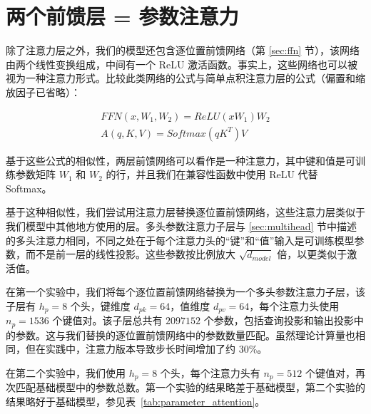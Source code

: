 \pagebreak
\section*{两个前馈层 = 参数注意力}\label{sec:parameter_attention}

除了注意力层之外，我们的模型还包含逐位置前馈网络（第 \ref{sec:ffn} 节），该网络由两个线性变换组成，中间有一个 ReLU 激活函数。事实上，这些网络也可以被视为一种注意力形式。比较此类网络的公式与简单点积注意力层的公式（偏置和缩放因子已省略）：

\begin{align*}
    FFN(x, W_1, W_2) = ReLU(xW_1)W_2 \\
    A(q, K, V) = Softmax(qK^T)V
\end{align*}

基于这些公式的相似性，两层前馈网络可以看作是一种注意力，其中键和值是可训练参数矩阵 $W_1$ 和 $W_2$ 的行，并且我们在兼容性函数中使用 ReLU 代替 Softmax。


基于这种相似性，我们尝试用注意力层替换逐位置前馈网络，这些注意力层类似于我们模型中其他地方使用的层。多头参数注意力子层与 \ref{sec:multihead} 节中描述的多头注意力相同，不同之处在于每个注意力头的“键”和“值”输入是可训练模型参数，而不是前一层的线性投影。这些参数按比例放大 $\sqrt{d_{model}}$ 倍，以更类似于激活值。

在第一个实验中，我们将每个逐位置前馈网络替换为一个多头参数注意力子层，该子层有 $h_p=8$ 个头，键维度 $d_{pk}=64$，值维度 $d_{pv}=64$，每个注意力头使用 $n_p=1536$ 个键值对。该子层总共有 $2097152$ 个参数，包括查询投影和输出投影中的参数。这与我们替换的逐位置前馈网络中的参数数量匹配。虽然理论计算量也相同，但在实践中，注意力版本导致步长时间增加了约 $30\%$。

在第二个实验中，我们使用 $h_p=8$ 个头，每个注意力头有 $n_p=512$ 个键值对，再次匹配基础模型中的参数总数。第一个实验的结果略差于基础模型，第二个实验的结果略好于基础模型，参见表~\ref{tab:parameter_attention}。

